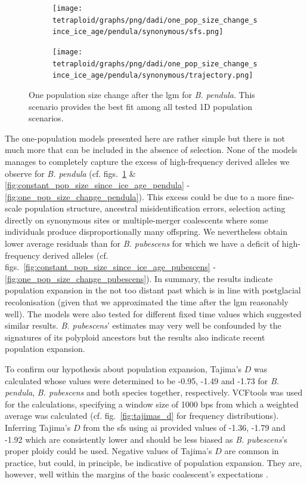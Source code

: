 \documentclass[hidelinks,11pt]{article}
\newcommand{\dadi}{\textdelta a\textdelta i}
\newcommand{\pendula}{\textit{B. pendula}}
\newcommand{\pubescens}{\textit{B. pubescens}}
\begin{document}
    \begin{figure}[H]
        \centering
        \begin{subfigure}[b]{0.465\textwidth}
            \texttt{[image: tetraploid/graphs/png/dadi/one\_pop\_size\_change\_since\_ice\_age/pendula/synonymous/sfs.png]}
        \end{subfigure}
        \hfill
        \begin{subfigure}[b]{0.525\textwidth}
            \texttt{[image: tetraploid/graphs/png/dadi/one\_pop\_size\_change\_since\_ice\_age/pendula/synonymous/trajectory.png]}
        \end{subfigure}
        \caption{One population size change after the \acrshort{lgm} for \pendula{}. This scenario provides the best fit among all tested 1D population scenarios.}
        \label{fig:one_pop_size_change_since_ice_age_pendula}
    \end{figure}

    The one-population models presented here are rather simple but there is not much more that can be included in the absence of selection. None of the models manages to completely capture the excess of high-frequency derived alleles we observe for \pendula{} (cf. figs.~\ref{fig:one_pop_size_change_since_ice_age_pendula} \& \ref{fig:constant_pop_size_since_ice_age_pendula} - \ref{fig:one_pop_size_change_pendula}). This excess could be due to a more fine-scale population structure, ancestral misidentification errors, selection acting directly on synonymous sites or multiple-merger coalescents where some individuals produce disproportionally many offspring. We nevertheless obtain lower average residuals than for \pubescens{} for which we have a deficit of high-frequency derived alleles (cf. figs.~\ref{fig:constant_pop_size_since_ice_age_pubescens} - \ref{fig:one_pop_size_change_pubescens}). In summary, the results indicate population expansion in the not too distant past which is in line with postglacial recolonisation (given that we approximated the time after the \acrshort{lgm} reasonably well). The models were also tested for different fixed time values which suggested similar results. \pubescens{}' estimates may very well be confounded by the signatures of its polyploid ancestors but the results also indicate recent population expansion.

    To confirm our hypothesis about population expansion, Tajima's $D$ was calculated whose values were determined to be -0.95, -1.49 and -1.73 for \pendula{}, \pubescens{} and both species together, respectively. VCFtools was used for the calculations, specifying a window size of 1000 bps from which a weighted average was calculated (cf. fig.~\ref{fig:tajimas_d} for frequency distributions). Inferring Tajima's $D$ from the \acrshort{sfs} using \dadi{} provided values of -1.36, -1.79 and -1.92 which are consistently lower and should be less biased as \pubescens{}'s proper ploidy could be used. Negative values of Tajima's $D$ are common in practice, but could, in principle, be indicative of population expansion. They are, however, well within the margins of the basic coalescent's expectations \cite{hein,gillespie}.
\end{document}
